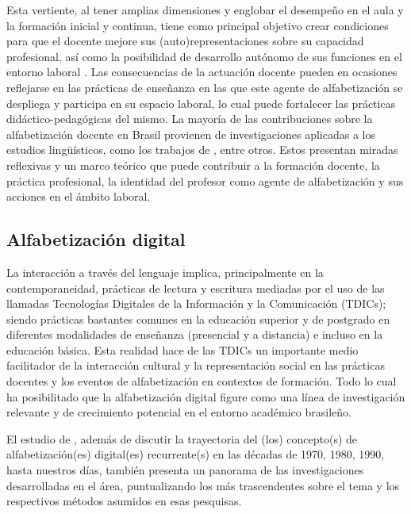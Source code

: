 \documentclass[spanish]{textolivre}
\begin{document}
Esta vertiente, al tener amplias dimensiones y englobar el desempeño en el aula y la formación inicial y continua, tiene como principal objetivo crear condiciones para que el docente mejore sus (auto)representaciones sobre su capacidad profesional, así como la posibilidad de desarrollo autónomo de sus funciones en el entorno laboral \cite{kleiman_projetos_2009}. Las consecuencias de la actuación docente pueden en ocasiones reflejarse en las prácticas de enseñanza en las que este agente de alfabetización se despliega y participa en su espacio laboral, lo cual puede fortalecer las prácticas didáctico-pedagógicas del mismo.
La mayoría de las contribuciones sobre la alfabetización docente en Brasil provienen de investigaciones aplicadas a los estudios lingüísticos, como los trabajos de \textcite{kleiman_processos_2006, kleiman_projetos_2009, oliveira_variacao_2010, kleiman_estudos_2014}, entre otros. Estos presentan miradas reflexivas y un marco teórico que puede contribuir a la formación docente, la práctica profesional, la identidad del profesor como agente de alfabetización \cite{kleiman_processos_2006, kleiman_projetos_2009} y sus acciones en el ámbito laboral.

\subsection{Alfabetización digital}\label{sec-digital}
La interacción a través del lenguaje implica, principalmente en la contemporaneidad, prácticas de lectura y escritura mediadas por el uso de las llamadas Tecnologías Digitales de la Información y la Comunicación (TDICs); siendo prácticas bastantes comunes en la educación superior y de postgrado en diferentes modalidades de enseñanza (presencial y a distancia) e incluso en la educación básica. Esta realidad hace de las TDICs un importante medio facilitador de la interacción cultural y la representación social en las prácticas docentes y los eventos de alfabetización en contextos de formación. Todo lo cual ha posibilitado que la alfabetización digital figure como una línea de investigación relevante y de crecimiento potencial en el entorno académico brasileño.

El estudio de \textcite{araujo_letramento_2014}, además de discutir la trayectoria del (los) concepto(s) de alfabetización(es) digital(es) recurrente(s) en las décadas de 1970, 1980, 1990, hasta nuestros días, también presenta un panorama de las investigaciones desarrolladas en el área, puntualizando los más trascendentes sobre el tema y los respectivos métodos asumidos en esas pesquisas.
\end{document}
